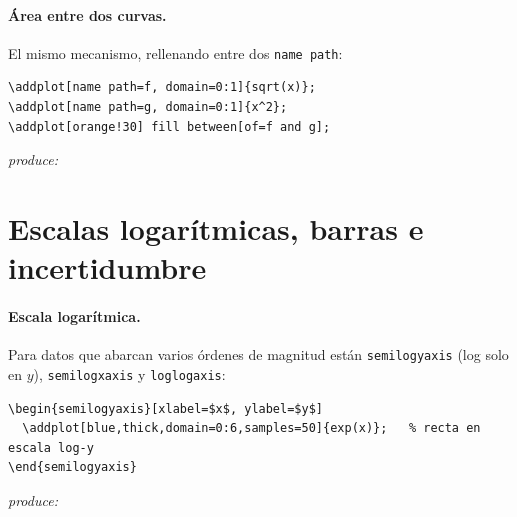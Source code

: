 \documentclass[11pt,a4paper]{article}
\newcommand{\produce}{\par\smallskip\noindent\textit{produce:}\par\smallskip}
\begin{document}
\paragraph{Área entre dos curvas.} El mismo mecanismo, rellenando entre dos
\texttt{name path}:
\begin{lstlisting}
\addplot[name path=f, domain=0:1]{sqrt(x)};
\addplot[name path=g, domain=0:1]{x^2};
\addplot[orange!30] fill between[of=f and g];
\end{lstlisting}
\produce
\begin{center}
\end{center}

\section{Escalas logarítmicas, barras e incertidumbre}
\paragraph{Escala logarítmica.} Para datos que abarcan varios órdenes de magnitud
están \texttt{semilogyaxis} (log solo en $y$), \texttt{semilogxaxis} y
\texttt{loglogaxis}:
\begin{lstlisting}
\begin{semilogyaxis}[xlabel=$x$, ylabel=$y$]
  \addplot[blue,thick,domain=0:6,samples=50]{exp(x)};   % recta en escala log-y
\end{semilogyaxis}
\end{lstlisting}
\produce
\begin{center}
\end{center}
\end{document}
